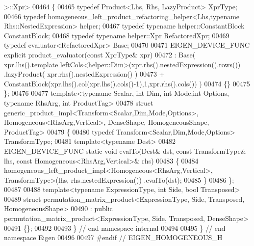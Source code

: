\begin{DoxyCode}
      >::Xpr>
00464 \{
00465   \textcolor{keyword}{typedef} Product<Lhs, Rhs, LazyProduct> XprType;
00466   \textcolor{keyword}{typedef} homogeneous\_left\_product\_refactoring\_helper<Lhs,typename Rhs::NestedExpression> helper;
00467   \textcolor{keyword}{typedef} \textcolor{keyword}{typename} helper::ConstantBlock ConstantBlock;
00468   \textcolor{keyword}{typedef} \textcolor{keyword}{typename} helper::Xpr RefactoredXpr;
00469   \textcolor{keyword}{typedef} evaluator<RefactoredXpr> Base;
00470   
00471   EIGEN\_DEVICE\_FUNC \textcolor{keyword}{explicit} product\_evaluator(\textcolor{keyword}{const} XprType& xpr)
00472     : Base(   xpr.lhs().template leftCols<helper::Dim>(xpr.rhs().nestedExpression().rows()) .lazyProduct( 
      xpr.rhs().nestedExpression() )
00473             + ConstantBlock(xpr.lhs().col(xpr.lhs().cols()-1),1,xpr.rhs().cols()) )
00474   \{\}
00475 \};
00476 
00477 \textcolor{keyword}{template}<\textcolor{keyword}{typename} Scalar, \textcolor{keywordtype}{int} Dim, \textcolor{keywordtype}{int} Mode,\textcolor{keywordtype}{int} Options, \textcolor{keyword}{typename} RhsArg, \textcolor{keywordtype}{int} ProductTag>
00478 \textcolor{keyword}{struct }generic\_product\_impl<Transform<Scalar,Dim,Mode,Options>, Homogeneous<RhsArg,Vertical>, DenseShape, 
      HomogeneousShape, ProductTag>
00479 \{
00480   \textcolor{keyword}{typedef} Transform<Scalar,Dim,Mode,Options> TransformType;
00481   \textcolor{keyword}{template}<\textcolor{keyword}{typename} Dest>
00482   EIGEN\_DEVICE\_FUNC \textcolor{keyword}{static} \textcolor{keywordtype}{void} evalTo(Dest& dst, \textcolor{keyword}{const} TransformType& lhs, \textcolor{keyword}{const} 
      Homogeneous<RhsArg,Vertical>& rhs)
00483   \{
00484     homogeneous\_left\_product\_impl<Homogeneous<RhsArg,Vertical>, TransformType>(lhs, rhs.nestedExpression())
      .evalTo(dst);
00485   \}
00486 \};
00487 
00488 \textcolor{keyword}{template}<\textcolor{keyword}{typename} ExpressionType, \textcolor{keywordtype}{int} S\textcolor{keywordtype}{id}e, \textcolor{keywordtype}{bool} Transposed>
00489 \textcolor{keyword}{struct }permutation\_matrix\_product<ExpressionType, Side, Transposed, HomogeneousShape>
00490   : \textcolor{keyword}{public} permutation\_matrix\_product<ExpressionType, Side, Transposed, DenseShape>
00491 \{\};
00492 
00493 \} \textcolor{comment}{// end namespace internal}
00494 
00495 \} \textcolor{comment}{// end namespace Eigen}
00496 
00497 \textcolor{preprocessor}{#endif // EIGEN\_HOMOGENEOUS\_H}
\end{DoxyCode}
